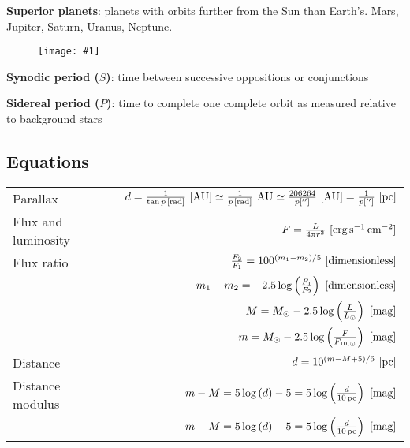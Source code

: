 \documentclass[a4paper,10pt]{article}
\newcommand{\fig}[1]{\centerline{\texttt{[image: \#1]}}}
\begin{document}
\textbf{Superior planets}: planets with orbits further from the Sun than Earth's. Mars, Jupiter, Saturn, Uranus, Neptune. 

\begin{figure}[h]
    \fig{orbital_configs}
\end{figure}


\textbf{Synodic period ($S$)}: time between successive oppositions or conjunctions 

\textbf{Sidereal period ($P$)}: time to complete one complete orbit as measured relative to background stars

\subsection{Equations}
\vspace{0.5cm}

\begin{tabularx}{\textwidth}{ l X r }
    Parallax && $d = \frac{1}{\tan p\,[{\rm rad}]}~[{\rm AU}] \simeq \frac{1}{p\,[{\rm rad}]}~{\rm AU} \simeq \frac{206264}{p['']}~[{\rm AU}] = \frac{1}{p['']}~[{\rm pc}]$ \\ 
    \addlinespace[0.5cm]
    Flux and luminosity && $F = \frac{L}{4\pi r^2}~[{\rm erg\,s^{-1}\,cm^{-2}}]$ \\
    \addlinespace[0.5cm]
    Flux ratio && $\frac{F_2}{F_1} = 100^{(m_1-m_2)/5}~[{\rm dimensionless}]$ \\
    \addlinespace[0.5cm]
               && $m_1 - m_2 = -2.5\log\left(\frac{F_1}{F_2}\right)~[{\rm dimensionless}]$ \\
    \addlinespace[0.5cm]
               && $M = M_\odot - 2.5\log\left(\frac{L}{L_\odot}\right)~[{\rm mag}]$ \\
    \addlinespace[0.5cm]
               && $m = M_\odot - 2.5\log\left(\frac{F}{F_{10, \odot}}\right)~[{\rm mag}]$ \\
    \addlinespace[0.5cm]
    Distance && $d = 10^{(m-M+5)/5}~[{\rm pc}]$ \\
    \addlinespace[0.5cm]
    Distance modulus && $m-M = 5\log\left(d\right)-5 = 5\log\left({\frac{d}{10\,{\rm pc}}}\right)~[{\rm mag}]$ \\ 
    \addlinespace[0.5cm]
                     && $m-M = 5\log\left(d\right)-5 = 5\log\left({\frac{d}{10\,{\rm pc}}}\right)~[{\rm mag}]$
\end{tabularx}



\end{document}
